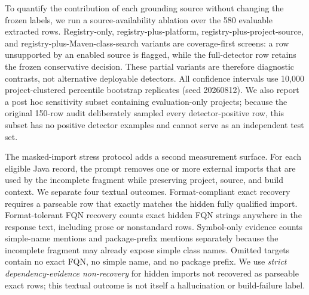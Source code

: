 \documentclass[pdflatex,sn-basic]{sn-jnl}
\newcommand{\codeid}[1]{\texttt{\detokenize{#1}}}
\begin{document}
To quantify the contribution of each grounding source without changing the frozen labels, we run a source-availability ablation over the 580 evaluable extracted rows. Registry-only, registry-plus-platform, registry-plus-project-source, and registry-plus-Maven-class-search variants are coverage-first screens: a row unsupported by an enabled source is flagged, while the full-detector row retains the frozen conservative decision. These partial variants are therefore diagnostic contrasts, not alternative deployable detectors. All confidence intervals use 10,000 project-clustered percentile bootstrap replicates (seed 20260812). We also report a post hoc sensitivity subset containing evaluation-only projects; because the original 150-row audit deliberately sampled every detector-positive row, this subset has no positive detector examples and cannot serve as an independent test set.

The masked-import stress protocol adds a second measurement surface. For each eligible Java record, the prompt removes one or more external imports that are used by the incomplete fragment while preserving project, source, and build context. We separate four textual outcomes. Format-compliant exact recovery requires a parseable \codeid{Import:} row that exactly matches the hidden fully qualified import. Format-tolerant FQN recovery counts exact hidden FQN strings anywhere in the response text, including prose or nonstandard rows. Symbol-only evidence counts simple-name mentions and package-prefix mentions separately because the incomplete fragment may already expose simple class names. Omitted targets contain no exact FQN, no simple name, and no package prefix. We use \emph{strict dependency-evidence non-recovery} for hidden imports not recovered as parseable exact \codeid{Import:} rows; this textual outcome is not itself a hallucination or build-failure label.
\end{document}
